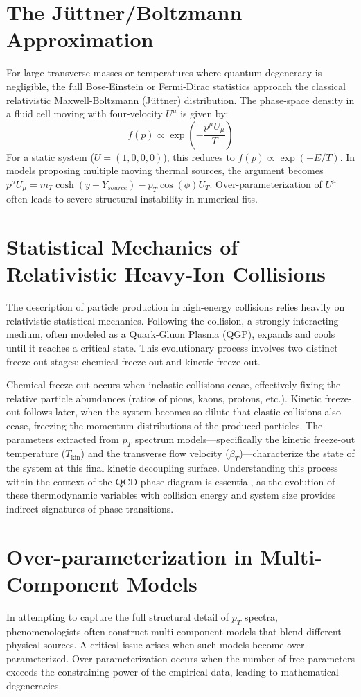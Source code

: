 \section{The J\"uttner/Boltzmann Approximation}
For large transverse masses or temperatures where quantum degeneracy is negligible, the full Bose-Einstein or Fermi-Dirac statistics approach the classical relativistic Maxwell-Boltzmann (J\"uttner) distribution. The phase-space density in a fluid cell moving with four-velocity $U^\mu$ is given by:
\begin{equation}
f(p) \propto \exp\left(-\frac{p^\mu U_\mu}{T}\right)
\end{equation}
For a static system ($U = (1, 0, 0, 0)$), this reduces to $f(p) \propto \exp(-E/T)$. In models proposing multiple moving thermal sources, the argument becomes $p^\mu U_\mu = m_T \cosh(y - Y_{source}) - p_T \cos(\phi) U_T$. Over-parameterization of $U^\mu$ often leads to severe structural instability in numerical fits.

\section{Statistical Mechanics of Relativistic Heavy-Ion Collisions}
The description of particle production in high-energy collisions relies heavily on relativistic statistical mechanics. Following the collision, a strongly interacting medium, often modeled as a Quark-Gluon Plasma (QGP), expands and cools until it reaches a critical state. This evolutionary process involves two distinct freeze-out stages: chemical freeze-out and kinetic freeze-out. 

Chemical freeze-out occurs when inelastic collisions cease, effectively fixing the relative particle abundances (ratios of pions, kaons, protons, etc.). Kinetic freeze-out follows later, when the system becomes so dilute that elastic collisions also cease, freezing the momentum distributions of the produced particles. The parameters extracted from $p_T$ spectrum models—specifically the kinetic freeze-out temperature ($T_{\text{kin}}$) and the transverse flow velocity ($\beta_T$)—characterize the state of the system at this final kinetic decoupling surface. Understanding this process within the context of the QCD phase diagram is essential, as the evolution of these thermodynamic variables with collision energy and system size provides indirect signatures of phase transitions.

\section{Over-parameterization in Multi-Component Models}
In attempting to capture the full structural detail of $p_T$ spectra, phenomenologists often construct multi-component models that blend different physical sources. A critical issue arises when such models become over-parameterized. Over-parameterization occurs when the number of free parameters exceeds the constraining power of the empirical data, leading to mathematical degeneracies. 

